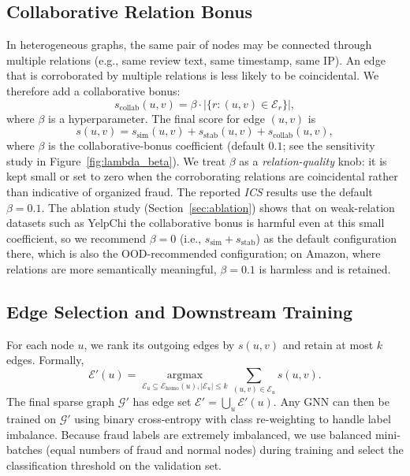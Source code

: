 \documentclass[11pt]{article}
\begin{document}
\subsection{Collaborative Relation Bonus}\label{sec:collab}

In heterogeneous graphs, the same pair of nodes may be connected through multiple relations (e.g., same review text, same timestamp, same IP). An edge that is corroborated by multiple relations is less likely to be coincidental. We therefore add a collaborative bonus:
\begin{equation}
    s_{\text{collab}}(u,v) = \beta \cdot \big|\{r : (u,v)\in\mathcal{E}_r\}\big|,
\end{equation}
where $\beta$ is a hyperparameter. The final score for edge $(u,v)$ is
\begin{equation}\label{eq:score}
    s(u,v) = s_{\text{sim}}(u,v) + s_{\text{stab}}(u,v) + s_{\text{collab}}(u,v),
\end{equation}
where $\beta$ is the collaborative-bonus coefficient (default $0.1$; see the sensitivity study in Figure~\ref{fig:lambda_beta}). We treat $\beta$ as a \emph{relation-quality} knob: it is kept small or set to zero when the corroborating relations are coincidental rather than indicative of organized fraud. The reported \emph{ICS} results use the default $\beta=0.1$. The ablation study (Section~\ref{sec:ablation}) shows that on weak-relation datasets such as YelpChi the collaborative bonus is harmful even at this small coefficient, so we recommend $\beta=0$ (i.e., $s_{\text{sim}}+s_{\text{stab}}$) as the default configuration there, which is also the OOD-recommended configuration; on Amazon, where relations are more semantically meaningful, $\beta=0.1$ is harmless and is retained.

\subsection{Edge Selection and Downstream Training}\label{sec:selection}

For each node $u$, we rank its outgoing edges by $s(u,v)$ and retain at most $k$ edges. Formally,
\begin{equation}
    \mathcal{E}'(u) = \mathop{\arg\max}\limits_{\mathcal{E}_u\subseteq\mathcal{E}_{\text{homo}}(u), |\mathcal{E}_u|\le k} \sum_{(u,v)\in\mathcal{E}_u} s(u,v).
\end{equation}
The final sparse graph $\mathcal{G}'$ has edge set $\mathcal{E}'=\bigcup_u \mathcal{E}'(u)$. Any GNN can then be trained on $\mathcal{G}'$ using binary cross-entropy with class re-weighting to handle label imbalance. Because fraud labels are extremely imbalanced, we use balanced mini-batches (equal numbers of fraud and normal nodes) during training and select the classification threshold on the validation set.
\end{document}
